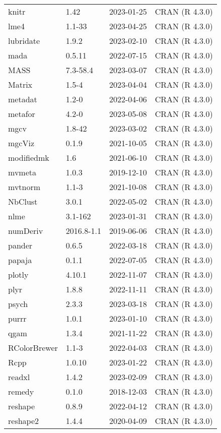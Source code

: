\documentclass[
]{article}
\begin{document}
\begin{table}
\begin{tabular}[t]{llll}
knitr & 1.42 & 2023-01-25 & CRAN (R 4.3.0)\\
lme4 & 1.1-33 & 2023-04-25 & CRAN (R 4.3.0)\\
\addlinespace
lubridate & 1.9.2 & 2023-02-10 & CRAN (R 4.3.0)\\
mada & 0.5.11 & 2022-07-15 & CRAN (R 4.3.0)\\
MASS & 7.3-58.4 & 2023-03-07 & CRAN (R 4.3.0)\\
Matrix & 1.5-4 & 2023-04-04 & CRAN (R 4.3.0)\\
metadat & 1.2-0 & 2022-04-06 & CRAN (R 4.3.0)\\
\addlinespace
metafor & 4.2-0 & 2023-05-08 & CRAN (R 4.3.0)\\
mgcv & 1.8-42 & 2023-03-02 & CRAN (R 4.3.0)\\
mgcViz & 0.1.9 & 2021-10-05 & CRAN (R 4.3.0)\\
modifiedmk & 1.6 & 2021-06-10 & CRAN (R 4.3.0)\\
mvmeta & 1.0.3 & 2019-12-10 & CRAN (R 4.3.0)\\
\addlinespace
mvtnorm & 1.1-3 & 2021-10-08 & CRAN (R 4.3.0)\\
NbClust & 3.0.1 & 2022-05-02 & CRAN (R 4.3.0)\\
nlme & 3.1-162 & 2023-01-31 & CRAN (R 4.3.0)\\
numDeriv & 2016.8-1.1 & 2019-06-06 & CRAN (R 4.3.0)\\
pander & 0.6.5 & 2022-03-18 & CRAN (R 4.3.0)\\
\addlinespace
papaja & 0.1.1 & 2022-07-05 & CRAN (R 4.3.0)\\
plotly & 4.10.1 & 2022-11-07 & CRAN (R 4.3.0)\\
plyr & 1.8.8 & 2022-11-11 & CRAN (R 4.3.0)\\
psych & 2.3.3 & 2023-03-18 & CRAN (R 4.3.0)\\
purrr & 1.0.1 & 2023-01-10 & CRAN (R 4.3.0)\\
\addlinespace
qgam & 1.3.4 & 2021-11-22 & CRAN (R 4.3.0)\\
RColorBrewer & 1.1-3 & 2022-04-03 & CRAN (R 4.3.0)\\
Rcpp & 1.0.10 & 2023-01-22 & CRAN (R 4.3.0)\\
readxl & 1.4.2 & 2023-02-09 & CRAN (R 4.3.0)\\
remedy & 0.1.0 & 2018-12-03 & CRAN (R 4.3.0)\\
\addlinespace
reshape & 0.8.9 & 2022-04-12 & CRAN (R 4.3.0)\\
reshape2 & 1.4.4 & 2020-04-09 & CRAN (R 4.3.0)\\

\end{tabular}
\end{table}
\end{document}
